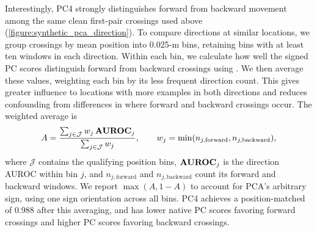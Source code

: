 Interestingly, PC4 strongly distinguishes forward from backward movement among the same clean first-pair crossings used above (\autoref{figure:synthetic_pca_direction}). To compare directions at similar locations, we group crossings by mean position into 0.025-m bins, retaining bins with at least ten windows in each direction. Within each bin, we calculate how well the signed PC scores distinguish forward from backward crossings using . We then average these values, weighting each bin by its less frequent direction count. This gives greater influence to locations with more examples in both directions and reduces confounding from differences in where forward and backward crossings occur. The weighted average is
\begin{equation}
\label{eq:pca_position_matched_auroc}
A=\frac{\sum_{j\in\mathcal{J}}w_j\,\mathbf{AUROC}_j}{\sum_{j\in\mathcal{J}}w_j},
\qquad w_j=\min(n_{j,\mathrm{forward}},n_{j,\mathrm{backward}}),
\end{equation}
where $\mathcal{J}$ contains the qualifying position bins, $\mathbf{AUROC}_j$ is the direction AUROC within bin $j$, and $n_{j,\mathrm{forward}}$ and $n_{j,\mathrm{backward}}$ count its forward and backward windows. We report $\max(A,1-A)$ to account for PCA's arbitrary sign, using one sign orientation across all bins. PC4 achieves a position-matched  of 0.988 after this averaging, and has lower native PC scores favoring forward crossings and higher PC scores favoring backward crossings.
